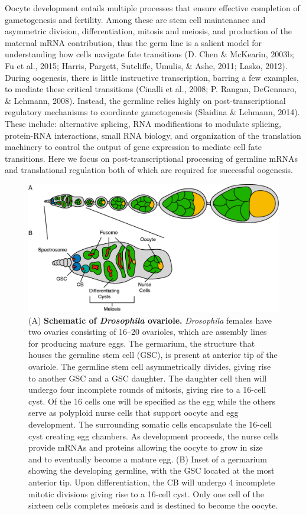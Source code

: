 \documentclass[12pt,oneside]{reedthesis}
\begin{document}
Oocyte development entails multiple processes that ensure effective
completion of gametogenesis and fertility. Among these are stem cell
maintenance and asymmetric division, differentiation, mitosis and
meiosis, and production of the maternal mRNA contribution, thus the germ
line is a salient model for understanding how cells navigate fate
transitions (D. Chen \& McKearin, 2003b; Fu et al., 2015; Harris, Pargett, Sutcliffe, Umulis, \& Ashe, 2011; Lasko, 2012).
During oogenesis, there is little instructive transcription, barring a
few examples, to mediate these critical transitions (Cinalli et al., 2008; P. Rangan, DeGennaro, \& Lehmann, 2008). Instead, the germline relies highly on
post-transcriptional regulatory mechanisms to coordinate gametogenesis
(Slaidina \& Lehmann, 2014). These include: alternative splicing, RNA
modifications to modulate splicing, protein-RNA interactions, small RNA
biology, and organization of the translation machinery to control the
output of gene expression to mediate cell fate transitions. Here we
focus on post-transcriptional processing of germline mRNAs and
translational regulation both of which are required for successful
oogenesis.
\begin{figure}

{\centering \includegraphics[width=0.97\linewidth]{./figure/Book Chapter/Figure1} 

}

\caption[\textbf{Schematic of \emph{Drosophila} ovariole.}]{(A) \textbf{Schematic of \emph{Drosophila} ovariole.} \emph{Drosophila} females have two ovaries consisting of 16--20 ovarioles, which are assembly lines for producing mature eggs. The germarium, the structure that houses the germline stem cell (GSC), is present at anterior tip of the ovariole. The germline stem cell asymmetrically divides, giving rise to another GSC and a GSC daughter. The daughter cell then will undergo four incomplete rounds of mitosis, giving rise to a 16-cell cyst. Of the 16 cells one will be specified as the egg while the others serve as polyploid nurse cells that support oocyte and egg development. The surrounding somatic cells encapsulate the 16-cell cyst creating egg chambers. As development proceeds, the nurse cells provide mRNAs and proteins allowing the oocyte to grow in size and to eventually become a mature egg. (B) Inset of a germarium showing the developing germline, with the GSC located at the most anterior tip. Upon differentiation, the CB will undergo 4 incomplete mitotic divisions giving rise to a 16-cell cyst. Only one cell of the sixteen cells completes meiosis and is destined to become the oocyte.}\label{fig:unnamed-chunk-4}
\end{figure}
\end{document}
